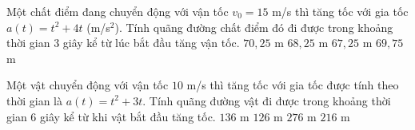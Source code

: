 \begin{ex}%
	Một chất điểm đang chuyển động với vận tốc $v_0 = 15$ m/s thì tăng tốc với gia tốc $a(t)=t^2+4t$ (m/s$^2$). Tính  quãng đường chất điểm đó đi được trong khoảng thời gian $3$ giây kể từ lúc bắt đầu tăng vận tốc.
	 \choice
		 {$70{,}25$ m}
		{$68{,}25$  m}
		 {$67{,}25$ m}
		{\True  $69{,}75$ m}
\end{ex}

\begin{ex}%
	Một vật chuyển động với vận tốc $10$ m/s thì tăng  tốc với gia tốc được tính theo thời gian là $a(t)=t^2+3t$. Tính quãng đường vật đi được trong khoảng thời gian $6$ giây kể từ khi vật bắt đầu tăng tốc.
	 \choice
		{$136$  m}
		{$126$ m} 
		 {\True $276$ m}
		{$216$ m} 
\end{ex}

